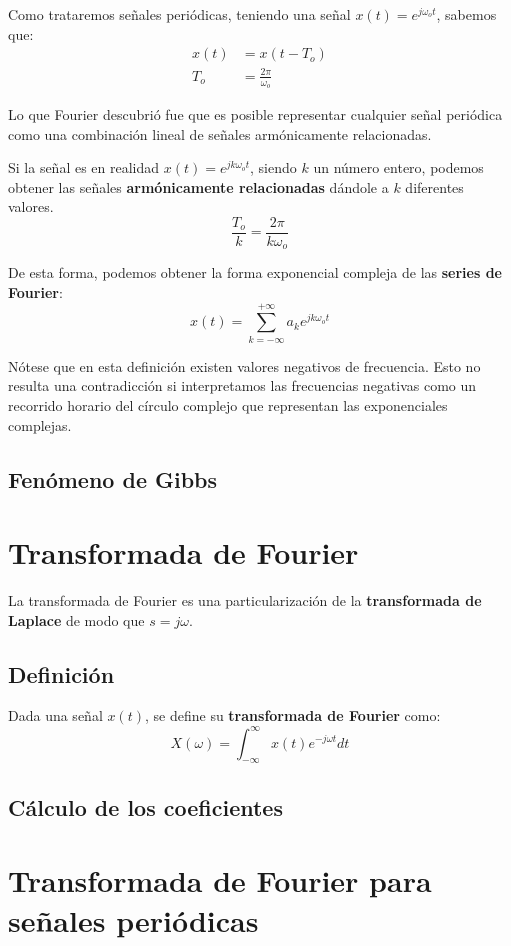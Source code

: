 \documentclass[a4paper]{book}
\begin{document}
Como trataremos señales periódicas, teniendo una señal $x(t) = e^{j\omega_ot}$, sabemos que:
\begin{align*}
x(t) & = x\left( t-T_o \right) \\
T_o  & = \frac{2\pi}{\omega_o}
\end{align*}

Lo que Fourier descubrió fue que es posible representar cualquier señal periódica como una combinación lineal de señales armónicamente relacionadas.

Si la señal es en realidad $x(t) = e^{jk\omega_ot}$, siendo $k$ un número entero, podemos obtener las señales \textbf{armónicamente relacionadas} dándole a $k$ diferentes valores.
\[\frac{T_o}{k} = \frac{2\pi}{k\omega_o}\]

De esta forma, podemos obtener la forma exponencial compleja de las \textbf{series de Fourier}:
\[\boxed{x(t) = \sum^{+\infty}_{k=-\infty}{a_ke^{jk\omega_ot}}}\]

Nótese que en esta definición existen valores negativos de frecuencia. Esto no resulta una contradicción si interpretamos las frecuencias negativas como un recorrido horario del círculo complejo que representan las exponenciales complejas.

\subsection{Fenómeno de Gibbs}

\section{Transformada de Fourier} \label{sec:Transformada_de_Fourier}
La transformada de Fourier es una particularización de la \textbf{transformada de Laplace} de modo que $s=j\omega$.
\subsection{Definición}
Dada una señal $x(t)$, se define su \textbf{transformada de Fourier} como: \[\boxed{X(\omega ) = \int_{-\infty}^{\infty}{x(t) e^{-j\omega t}dt}}\]

\subsection{Cálculo de los coeficientes}

\section{Transformada de Fourier para señales periódicas}
\end{document}
